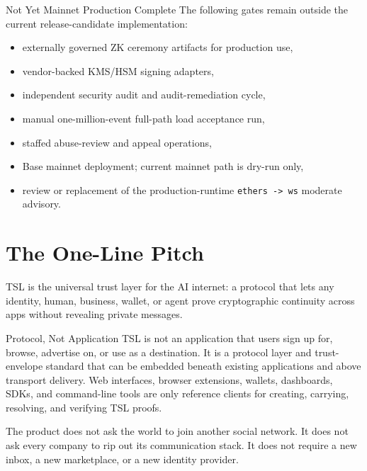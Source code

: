 \documentclass[11pt]{article}
\newcommand{\TSL}{\textsc{TSL}}
\begin{document}
\begin{warningbox}{Not Yet Mainnet Production Complete}
The following gates remain outside the current release-candidate implementation:
\begin{itemize}
    \item externally governed ZK ceremony artifacts for production use,
    \item vendor-backed KMS/HSM signing adapters,
    \item independent security audit and audit-remediation cycle,
    \item manual one-million-event full-path load acceptance run,
    \item staffed abuse-review and appeal operations,
    \item Base mainnet deployment; current mainnet path is dry-run only,
    \item review or replacement of the production-runtime \texttt{ethers -> ws} moderate advisory.
\end{itemize}
\end{warningbox}


\section{The One-Line Pitch}

\begin{thesisbox}
\TSL{} is the universal trust layer for the AI internet: a protocol that lets any identity, human, business, wallet, or agent prove cryptographic continuity across apps without revealing private messages.
\end{thesisbox}

\begin{principlebox}{Protocol, Not Application}
\TSL{} is not an application that users sign up for, browse, advertise on, or use as a destination. It is a protocol layer and trust-envelope standard that can be embedded beneath existing applications and above transport delivery. Web interfaces, browser extensions, wallets, dashboards, SDKs, and command-line tools are only reference clients for creating, carrying, resolving, and verifying \TSL{} proofs.
\end{principlebox}

The product does not ask the world to join another social network. It does not ask every company to rip out its communication stack. It does not require a new inbox, a new marketplace, or a new identity provider.
\end{document}
